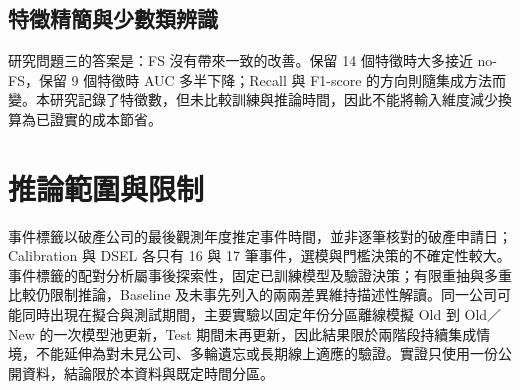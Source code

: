\subsection{特徵精簡與少數類辨識}

研究問題三的答案是：FS 沒有帶來一致的改善。保留 14 個特徵時大多接近 no-FS，保留 9 個特徵時 AUC 多半下降；Recall 與 F1-score 的方向則隨集成方法而變。本研究記錄了特徵數，但未比較訓練與推論時間，因此不能將輸入維度減少換算為已證實的成本節省。

\section{推論範圍與限制}

事件標籤以破產公司的最後觀測年度推定事件時間，並非逐筆核對的破產申請日；Calibration 與 DSEL 各只有 16 與 17 筆事件，選模與門檻決策的不確定性較大。事件標籤的配對分析屬事後探索性，固定已訓練模型及驗證決策；有限重抽與多重比較仍限制推論，Baseline 及未事先列入的兩兩差異維持描述性解讀。同一公司可能同時出現在擬合與測試期間，主要實驗以固定年份分區離線模擬 Old 到 Old／New 的一次模型池更新，Test 期間未再更新，因此結果限於兩階段持續集成情境，不能延伸為對未見公司、多輪遺忘或長期線上適應的驗證。實證只使用一份公開資料，結論限於本資料與既定時間分區。
\endgroup
